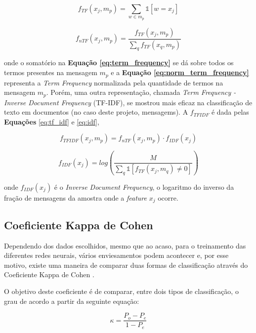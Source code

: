 \documentclass[conference]{IEEEtran}
\begin{document}
\begin{equation} \label{eq:term_frequency}
f_{TF}(x_{j}, m_p) = \sum_{w \in m_p} \mathds{1}\left[w = x_{j}\right]
\end{equation}

\begin{equation} \label{eq:norm_term_frequency}
f_{nTF}(x_{j}, m_p) = \frac{f_{TF}(x_j, m_p)}{\sum\limits_q f_{TF}(x_q, m_p)}
\end{equation}

\noindent onde o somatório na \textbf{Equação \eqref{eq:term_frequency}} se dá sobre todos os termos presentes na mensagem $m_p$ e a \textbf{Equação \eqref{eq:norm_term_frequency}} representa a \textit{Term Frequency} normalizada pela quantidade de termos na mensagem $m_p$. Porém, uma outra representação, chamada \textit{Term Frequency - Inverse Document Frequency} (TF-IDF), se mostrou mais eficaz na classificação de texto em documentos (no caso deste projeto, mensagems). A $f_{TFIDF}$ é dada pelas \textbf{Equações} \eqref{eq:tf_idf} e \eqref{eq:idf},

\begin{equation} \label{eq:tf_idf}
f_{TFIDF}(x_j, m_p) = f_{nTF}(x_j, m_p) \cdot f_{IDF}(x_j)
\end{equation}

\begin{equation} \label{eq:idf}
f_{IDF}(x_j) = log\left(\frac{M}{\sum\limits_{q} \mathds{1}\left[f_{TF}(x_j, m_q) \neq 0\right]}\right)
\end{equation}

\noindent onde $f_{IDF}(x_j)$ é o \textit{Inverse Document Frequency}, o logaritmo do inverso da fração de mensagens da amostra onde a \textit{feature} $x_j$ ocorre.

\subsection{Coeficiente Kappa de Cohen}

Dependendo dos dados escolhidos, mesmo que ao acaso, para o treinamento das diferentes redes neurais, vários enviesamentos podem acontecer e, por esse motivo, existe uma maneira de comparar duas formas de classificação através do Coeficiente Kappa de Cohen \cite{kappa}.

O objetivo deste coeficiente é de comparar, entre dois tipos de classificação, o grau de acordo a partir da seguinte equação:

\begin{equation} \label{eq:kappa}
\kappa = \frac{P_o - P_e}{1 - P_e}
\end{equation}
\end{document}
